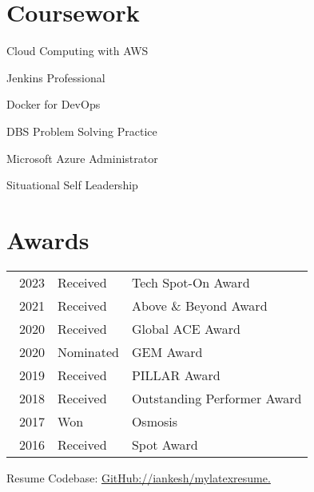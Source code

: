 \documentclass[a4paper]{deedy-resume-openfont}
\begin{document}
\begin{minipage}[t]{0.49\textwidth} 
\section{Coursework}
\vspace{\topsep}
\begin{tightemize}
\item Cloud Computing with AWS 
\item Jenkins Professional
\item Docker for DevOps
\item DBS Problem Solving Practice
\item Microsoft Azure Administrator
\item Situational Self Leadership
\end{tightemize}
\sectionsep

\end{minipage} 
\hfill
\begin{minipage}[t]{0.5\textwidth} 



\section{Awards} 
\begin{tabular}{rll}\
2023	 & Received & Tech Spot-On Award \\
2021	 & Received & Above \& Beyond Award \\
2020	 & Received & Global ACE Award \\
2020	 & Nominated& GEM Award\\
2019     & Received & PILLAR Award \\
2018     & Received & Outstanding Performer Award  \\
2017     & Won      & Osmosis \\
2016     & Received & Spot Award
\end{tabular}
\sectionsep

\end{minipage} 

\center{\rule{6.5in}{0.2mm}}
\vspace{-2mm}
\center \small {Resume Codebase: {\href{https://github.com/iankesh/mylatexresume}{GitHub://iankesh/mylatexresume.}}}
\end{document}

